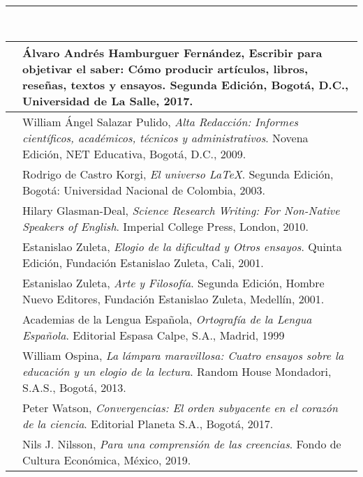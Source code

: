 \documentclass{article}
\begin{document}
\noindent\rule[0.8ex]{12.1cm}{0.25pt} \par
{} \\
\begin{tabular}{|c|m{11cm}|} \hline
[1] & Álvaro Andrés Hamburguer Fernández, { Escribir para objetivar el saber: Cómo producir artículos, libros, reseñas, textos y ensayos}. Segunda Edición, Bogotá, D.C., Universidad de La Salle, 2017. \\ \hline
[2] & William Ángel Salazar Pulido, {\it Alta Redacción: Informes científicos, académicos, técnicos y administrativos}. Novena Edición, NET Educativa, Bogotá, D.C., 2009. \\ \hline
[3] & Rodrigo de Castro Korgi, {\it El universo \LaTeX}. Segunda Edición, Bogotá: Universidad Nacional de Colombia, 2003. \\ \hline
[4] & Hilary Glasman-Deal, {\it Science Research Writing: For Non-Native Speakers of English}. Imperial College Press, London, 2010. \\ \hline
[5] & Estanislao Zuleta, {\it Elogio de la dificultad y Otros ensayos}. Quinta Edición, Fundación Estanislao Zuleta, Cali, 2001. \\ \hline
[6] & Estanislao Zuleta, {\it Arte y Filosofía}. Segunda Edición, Hombre Nuevo Editores, Fundación Estanislao Zuleta, Medellín, 2001. \\ \hline
[7] & Academias de la Lengua Española, {\it Ortografía de la Lengua Española}. Editorial Espasa Calpe, S.A., Madrid, 1999 \\ \hline
[8] & William Ospina, {\it La lámpara maravillosa: Cuatro ensayos sobre la educación y un elogio de la lectura}. Random House Mondadori, S.A.S., Bogotá, 2013. \\ \hline
[9] & Peter Watson, {\it Convergencias: El orden subyacente en el corazón de la ciencia}. Editorial Planeta S.A., Bogotá, 2017. \\ \hline
[10] & Nils J. Nilsson, {\it Para una comprensión de las creencias}. Fondo de Cultura Económica, México, 2019. \\ \hline
\end{tabular}
\end{document}
